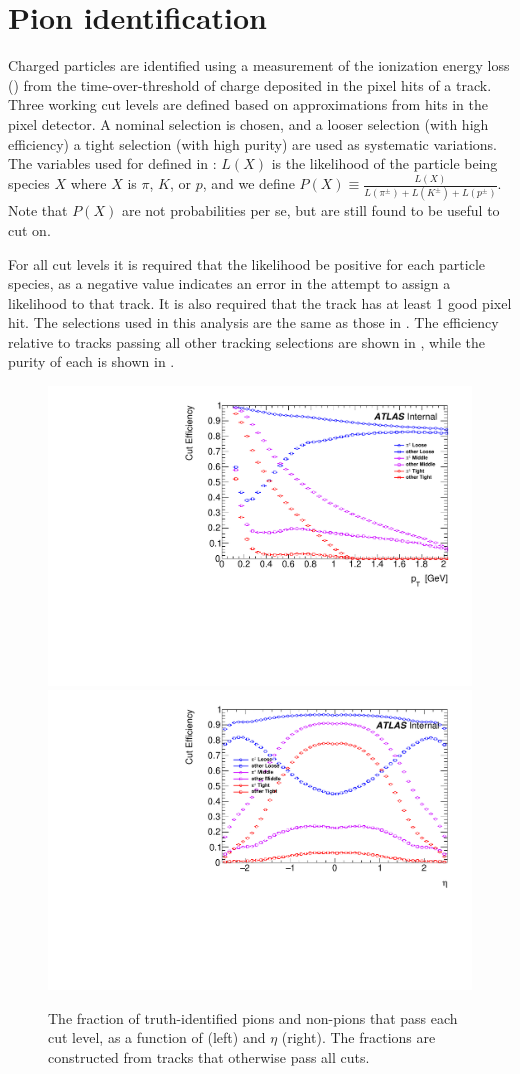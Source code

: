 \section{Pion identification}
\label{sec:pid}

Charged particles are identified using a measurement of the ionization energy loss (\dEdx) from the time-over-threshold of charge deposited in the pixel hits of a track.
Three working \pid cut levels are defined based on \dEdx approximations from hits in the pixel detector.
A nominal selection is chosen, and a looser selection (with high efficiency) a tight selection (with high purity) are used as systematic variations.
The variables used for \pid defined in : $L(X)$ is the likelihood of the particle being species $X$ where $X$ is $\pi$, $K$, or $p$, and we define $P(X) \equiv \frac{L(X)}{L(\pi^{\pm}) + L(K^{\pm}) +L(p^{\pm})}$.
Note that $P(X)$ are not probabilities per se, but are still found to be useful to cut on.

For all cut levels it is required that the likelihood be positive for each particle species, as a negative value indicates an error in the attempt to assign a likelihood to that track.
It is also required that the track has at least 1 good pixel \dEdx hit.
The \pid selections used in this analysis are the same as those in .
The efficiency relative to tracks passing all other tracking selections are shown in \Fig{\ref{fig:pid_eff}}, while the purity of each is shown in \Fig{\ref{fig:pid_purity}}.

\begin{figure}[ht]
\begin{minipage}[t]{1.0\textwidth}
\centering
\includegraphics[width=.49\linewidth]{pid_eff_pt.pdf}
\includegraphics[width=.49\linewidth]{pid_eff_eta.pdf}\\
\end{minipage}
\caption{The fraction of truth-identified pions and non-pions that pass each \pid cut level, as a function of \pt (left) and $\eta$ (right). The fractions are constructed from tracks that otherwise pass all cuts.}
\label{fig:pid_eff}
\end{figure}

